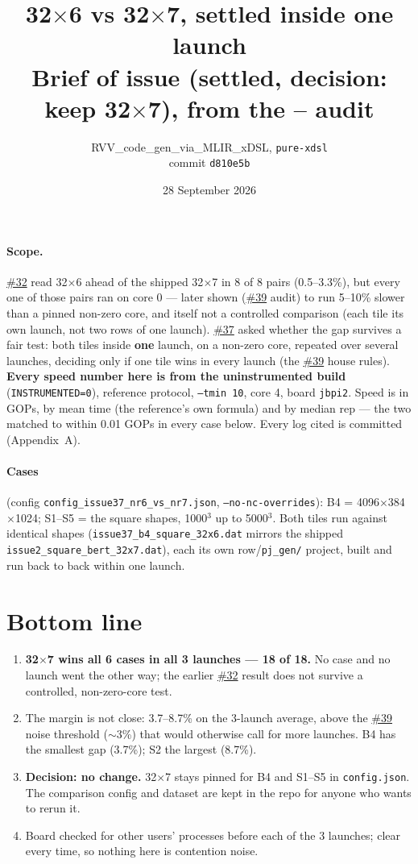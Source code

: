 \documentclass[10pt,a4paper]{article}
\title{\vspace{-1.2cm}\textbf{32$\times$6 vs 32$\times$7, settled inside one launch}\\[2pt]
\large Brief of issue \iss{37} (settled, decision: keep 32$\times$7), from the \iss{31}--\iss{34} audit}
\author{RVV\_code\_gen\_via\_MLIR\_xDSL, \texttt{pure-xdsl}\\ commit \texttt{d810e5b}}
\date{28 September 2026}
\newcommand{\iss}[1]{\href{https://github.com/JieGH/RVV_code_gen_via_MLIR_xDSL/issues/#1}{\##1}}
\newcommand{\up}[1]{\textcolor{red!70!black}{#1}}
\newcommand{\good}[1]{\textcolor{green!45!black}{\textbf{#1}}}
\begin{document}
\maketitle
\vspace{-0.8cm}

\paragraph{Scope.} \iss{32} read 32$\times$6 ahead of the shipped 32$\times$7 in 8 of 8 pairs (0.5--3.3\%), but
every one of those pairs ran on core 0 --- later shown (\iss{39} audit) to run 5--10\% slower than a pinned
non-zero core, and itself not a controlled comparison (each tile its own launch, not two rows of one launch).
\iss{37} asked whether the gap survives a fair test: both tiles inside \textbf{one} launch, on a non-zero core,
repeated over several launches, deciding only if one tile wins in every launch (the \iss{39} house rules).
\textbf{Every speed number here is from the uninstrumented build} (\texttt{INSTRUMENTED=0}), reference protocol,
\texttt{--tmin 10}, core 4, board \texttt{jbpi2}. Speed is in GOPs, by mean time (the reference's own formula)
and by median rep --- the two matched to within 0.01 GOPs in every case below. Every log cited is committed
(Appendix~A).

\paragraph{Cases} (config \texttt{config\_issue37\_nr6\_vs\_nr7.json}, \texttt{--no-nc-overrides}):
B4 = 4096$\times$384$\times$1024; S1--S5 = the square shapes, 1000$^3$ up to 5000$^3$. Both tiles run against
identical shapes (\texttt{issue37\_b4\_square\_32x6.dat} mirrors the shipped \texttt{issue2\_square\_bert\_32x7.dat}),
each its own row/\texttt{pj\_gen/} project, built and run back to back within one launch.

\section{Bottom line}
\begin{enumerate}
  \item \good{32$\times$7 wins all 6 cases in all 3 launches --- 18 of 18.} No case and no launch went the other
  way; the earlier \iss{32} result does not survive a controlled, non-zero-core test.
  \item The margin is not close: \up{3.7--8.7\%} on the 3-launch average, above the \iss{39} noise threshold
  ($\sim$3\%) that would otherwise call for more launches. B4 has the smallest gap (3.7\%); S2 the largest (8.7\%).
  \item \textbf{Decision: no change.} 32$\times$7 stays pinned for B4 and S1--S5 in \texttt{config.json}. The
  comparison config and dataset are kept in the repo for anyone who wants to rerun it.
  \item Board checked for other users' processes before each of the 3 launches; clear every time, so nothing here
  is contention noise.
\end{enumerate}
\end{document}
